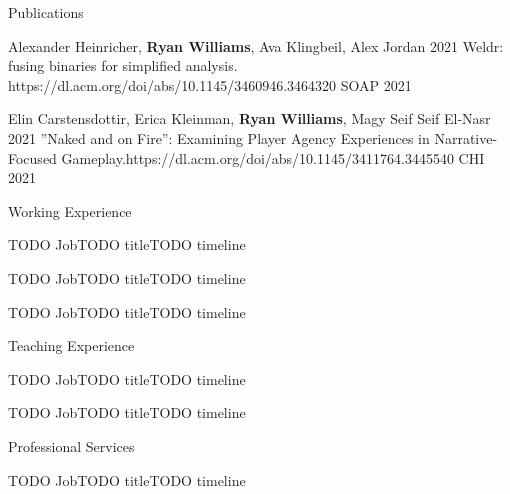 \documentclass[]{cv}
\begin{document}
\begin{section}{Publications}
\begin{pub}
    {Alexander Heinricher, \textbf{Ryan Williams}, Ava Klingbeil, Alex Jordan}
    {2021}
    {Weldr: fusing binaries for simplified analysis.}
    {https://dl.acm.org/doi/abs/10.1145/3460946.3464320}
    {SOAP 2021}
\end{pub}

\begin{pub}
    {Elin Carstensdottir, Erica Kleinman, \textbf{Ryan Williams}, Magy Seif Seif El-Nasr}
    {2021}
    {”Naked and on Fire”: Examining Player Agency Experiences in Narrative-Focused Gameplay.}{https://dl.acm.org/doi/abs/10.1145/3411764.3445540}
    {CHI 2021}
\end{pub}
    
\end{section}

\begin{section}{Working Experience}

\begin{subsectionnobullet}{TODO Job}{TODO title}{TODO timeline}
\end{subsectionnobullet}

\begin{subsectionnobullet}{TODO Job}{TODO title}{TODO timeline}
\end{subsectionnobullet}

\begin{subsectionnobullet}{TODO Job}{TODO title}{TODO timeline}
\end{subsectionnobullet}

\end{section}

\begin{section}{Teaching Experience}

\begin{subsectionnobullet}{TODO Job}{TODO title}{TODO timeline}
\end{subsectionnobullet}

\begin{subsectionnobullet}{TODO Job}{TODO title}{TODO timeline}
\end{subsectionnobullet}

\end{section}

\begin{section}{Professional Services}

\begin{subsectionnobullet}{TODO Job}{TODO title}{TODO timeline}
\end{subsectionnobullet}

\end{section}

\end{document}
